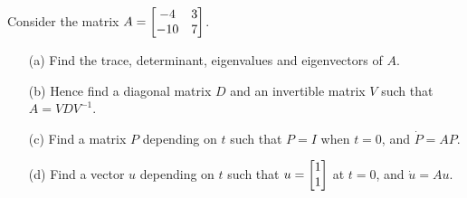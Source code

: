 \documentclass[a4paper]{amsart}
\begin{document}
\begin{exercise}\label{ex-diagonalise}
 Consider the matrix $A=\left[\begin{matrix} -4 & 3 \\ -10 & 7 \end{matrix}\right]$.
 \begin{itemize}
  \item[(a)] Find the trace, determinant, eigenvalues and eigenvectors
   of $A$.
  \item[(b)] Hence find a diagonal matrix $D$ and an invertible matrix
   $V$ such that $A=VDV^{-1}$.
  \item[(c)] Find a matrix $P$ depending on $t$ such that $P=I$ when
   $t=0$, and $\dot{P}=AP$.
  \item[(d)] Find a vector $u$ depending on $t$ such that
   $u=\left[\begin{matrix} 1\\ 1\end{matrix}\right]$ at $t=0$, and $\dot{u}=Au$.
 \end{itemize}
\end{exercise}
\end{document}
